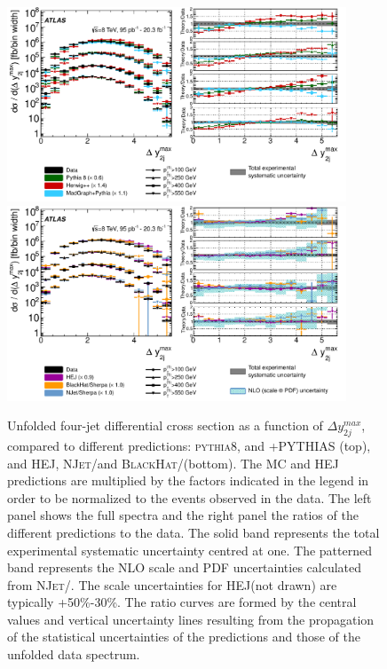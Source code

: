 \documentclass{PoS}
\providecommand{\NJET} {{\textsc{NJet}}\xspace}
\providecommand{\BLACKHAT} {{\textsc{BlackHat}}\xspace}
\providecommand{\HEJ} {{\textsc{HEJ}}\xspace}
\providecommand{\PYTHIAE} {{\textsc{pythia8}}\xspace}
\begin{document}
\begin{figure}[hbpt]
  \centering
  \includegraphics[width=0.9\textwidth]{Figure6a.pdf}\\
  \includegraphics[width=0.9\textwidth]{Figure6b.pdf}
  \caption{Unfolded four-jet differential cross section as a function of $\Delta y_{2j}^{max}$, compared to different
    predictions: \PYTHIAE, \HERWIGpp and \MADGRAPH+PYTHIAS (top), and HEJ, \NJET/\SHERPA and \BLACKHAT/\SHERPA (bottom). The MC
    and \HEJ predictions are multiplied by the factors indicated in the legend in order to be normalized to the events observed in the data. The left 
    panel shows the full spectra and the right panel the ratios of the different predictions to the data. The solid band represents the total experimental systematic
    uncertainty centred at one. The patterned band represents the NLO scale and PDF uncertainties calculated from
     \NJET/\SHERPA. The scale uncertainties for \HEJ (not drawn) are typically
    +50\%-30\%. The ratio curves are formed by the central values and vertical uncertainty lines resulting from the
    propagation of the statistical uncertainties of the predictions and those of the unfolded data spectrum.} 
  \label{fig:4jet}
\end{figure}
\end{document}
